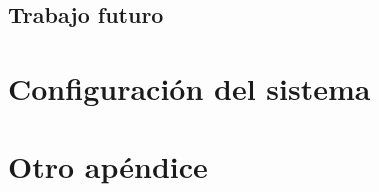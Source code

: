 \documentclass[11pt,spanish,listoffigures,listoftables]{tfgetsinf}
\begin{document}
\section{Trabajo futuro}               %


\printbibliography 
\cleardoublepage


\APPENDIX

\chapter{Configuración del sistema}

\chapter{Otro apéndice}
\end{document}
